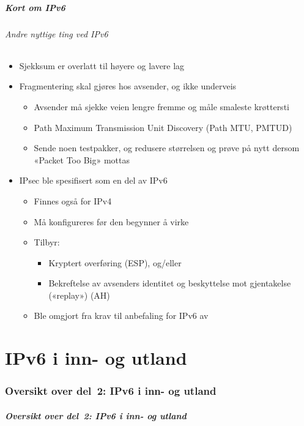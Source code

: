 \begin{frame}%
  \frametitle{Kort om IPv6}
  \framesubtitle{Andre nyttige ting ved IPv6}
  \begin{itemize}%
  \item Sjekksum er overlatt til høyere og lavere lag
  \item Fragmentering skal gjøres hos avsender, og ikke underveis
    \begin{itemize}%
    \item Avsender må sjekke veien lengre fremme og måle smaleste krøttersti
    \item Path Maximum Transmission Unit Discovery (Path MTU, PMTUD)
    \item Sende noen testpakker, og redusere størrelsen og prøve på
      nytt dersom «Packet Too Big» mottas
    \end{itemize}
  \item IPsec ble spesifisert som en del av IPv6
    \begin{itemize}%
    \item Finnes også for IPv4
    \item Må konfigureres før den begynner å virke
    \item Tilbyr:
      \begin{itemize}%
      \item Kryptert overføring (ESP), og/eller
      \item Bekreftelse av avsenders identitet og beskyttelse mot
        gjentakelse («replay») (AH)
      \end{itemize}
    \item Ble omgjort fra krav til anbefaling for IPv6 av 
    \end{itemize}
  \end{itemize}
\end{frame}

\part{IPv6 i inn- og utland}

\begin{frame}
  \partpage
\end{frame}

\section*{Oversikt over del~2: IPv6 i inn- og utland}
\begin{frame}%
  \frametitle{Oversikt over del~2: IPv6 i inn- og utland}
    \tableofcontents%
\end{frame}

